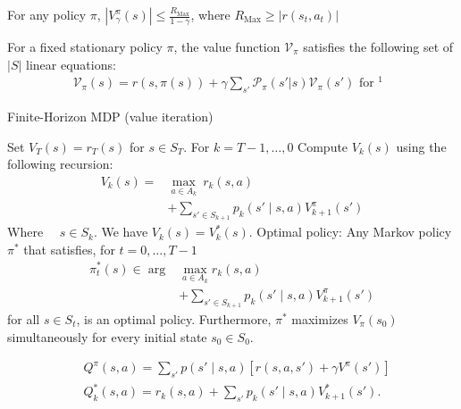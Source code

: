 \begin{clm} For any policy $\pi$, $|V_\gamma^\pi(s)| \leq \frac{R_{\text{Max}}}{1-\gamma}$, where $R_{\text{Max}} \geq |r(s_t,a_t)|$\end{clm}


\begin{lemm} For a fixed stationary policy $\pi$, the value function $\mathcal{V}_\pi$ satisfies the following set of $|S|$ linear equations:
\begin{align*}
\mathcal{V}_\pi(s) = r(s, \pi(s)) + \gamma \sum_{s'} \mathcal{P}_\pi(s'|s) \mathcal{V}_\pi(s') \text{ for $^1$ }\end{align*}
\end{lemm}

\begin{greyboxedalgorithm}
\vspace{-0.5cm}
\begin{algorithm}[H]
\caption{Finite-Horizon MDP (value iteration)}
\begin{footnotesize}
\begin{algorithmic}[1]
\STATE Set $V_T(s) = r_T(s)$ for $s \in S_T$.
\STATE For $k = T - 1, \ldots, 0$ Compute $V_k(s)$ using the following recursion:
   \begin{align*} V_k(s) =& \max_{a \in A_k} \ r_k(s, a) \\&+ \sum_{s' \in S_{k+1}} p_k(s' \mid s, a) V_{k+1}^\pi(s')  \end{align*} 
 Where $\quad s \in S_k$. We have $V_k(s) = V_k^*(s)$.
\STATE Optimal policy: Any Markov policy $\pi^*$ that satisfies, for $t = 0, \ldots, T-1$  \begin{align*}\pi_t^*(s) \in \arg &\max_{a \in A_k} r_k(s, a) \\&+ \sum_{s' \in S_{k+1}} p_k(s' \mid s, a) V_{k+1}^\pi(s')  \end{align*}  for all $s \in S_t$, is an optimal policy. Furthermore, $\pi^*$ maximizes $V_\pi(s_0)$ simultaneously for every initial state $s_0 \in S_0$.
\end{algorithmic}
\end{footnotesize}

\end{algorithm}
\end{greyboxedalgorithm}

\begin{deff}
\begin{align*}&Q^\pi(s, a) = \sum_{s'} p(s' \mid s, a) \left[ r(s, a, s') + \gamma V^\pi(s') \right]\\
&Q_k^*(s, a) = r_k(s, a) + \sum_{s'} p_k(s' \mid s, a) V_{k+1}^*(s').
\end{align*}

\end{deff}

